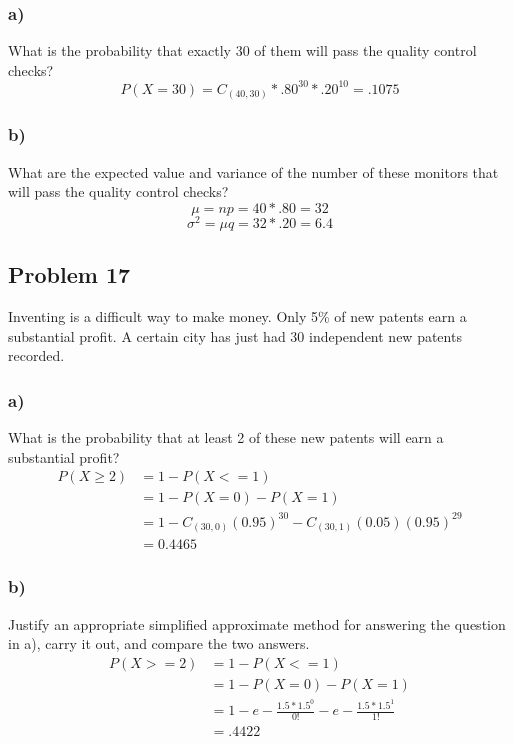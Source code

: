 \documentclass{article}
\begin{document}
\subsubsection*{a)}
What is the probability that exactly 30 of them will pass the quality control checks?
\begin{equation}
    P(X = 30) = C_{(40,30)}*.80^{30}*.20^{10} = .1075
\end{equation}
\subsubsection*{b)}
What are the expected value and variance of the number of these monitors that will pass the quality control checks?
\begin{equation}
    \mu = np = 40*.80 = 32
\end{equation}
\begin{equation}
    \sigma^2 = \mu q = 32 * .20 = 6.4
\end{equation}
\newpage
\subsection*{Problem 17}
Inventing is a difficult way to make money. Only 5\% of new patents earn a substantial profit. A certain city has just had 30 independent new patents recorded.
\subsubsection*{a)}
What is the probability that at least 2 of these new patents will earn a substantial profit?
\begin{align}
    P(X\geq2) &= 1- P(X<=1) \\
    &= 1-P(X=0)-P(X=1) \\
    &= 1-C_{(30,0)}(0.95)^{30} -C_{(30,1)}(0.05)(0.95)^{29}\\
    &=0.4465 
\end{align}
\subsubsection*{b)}
Justify an appropriate simplified approximate method for answering the question in a), carry it out, and compare the two answers.
\begin{align}
P(X>=2) &= 1-P(X<=1) \\
&=1-P(X=0)-P(X=1) \\
&=1-e-\frac{1.5*1.5^0}{0!}-e-\frac{1.5*1.5^1}{1!}\\
&= .4422
\end{align}
\end{document}

